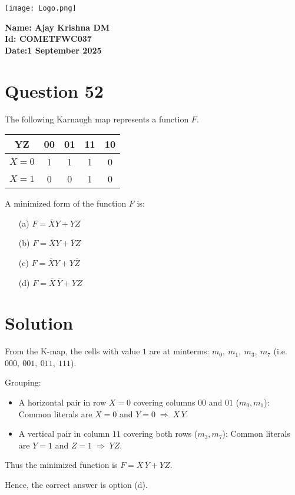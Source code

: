 \documentclass[12pt]{article}
\begin{document}
\begin{minipage}{0.45\textwidth}
  \texttt{[image: Logo.png]}
\end{minipage}
\hfill
\begin{minipage}{0.45\textwidth}
  \raggedleft
  \textbf{Name: Ajay Krishna DM}\\
  \textbf{Id: COMETFWC037}\\
  \textbf{Date:1 September 2025}\\
\end{minipage}

\vspace{1cm}

\section*{Question 52}

The following Karnaugh map represents a function $F$.

\begin{center}
\begin{tabular}{c|c c c c}
   YZ & 00 & 01 & 11 & 10 \\ \hline
   $X=0$ & 1 & 1 & 1 & 0 \\
   $X=1$ & 0 & 0 & 1 & 0 \\
\end{tabular}
\end{center}

\noindent
A minimized form of the function $F$ is:
\begin{enumerate}
  \item[(a)] $F = \overline{X}Y + YZ$
  \item[(b)] $F = \overline{X}Y + \overline{Y}Z$
  \item[(c)] $F = \overline{X}Y + Y\overline{Z}$
  \item[(d)] $F = \overline{X}\,\overline{Y} + YZ$
\end{enumerate}

\section*{Solution}

From the K-map, the cells with value $1$ are at minterms:  
$m_0, \ m_1, \ m_3, \ m_7$ (i.e. $000, \ 001, \ 011, \ 111$).

\noindent
Grouping:
\begin{itemize}
  \item A horizontal pair in row $X=0$ covering columns $00$ and $01$ ($m_0, m_1$):  
  Common literals are $X=0$ and $Y=0 \;\Rightarrow\; \overline{X}\,\overline{Y}$.
  
  \item A vertical pair in column $11$ covering both rows ($m_3, m_7$):  
  Common literals are $Y=1$ and $Z=1 \;\Rightarrow\; YZ$.
\end{itemize}

\noindent
Thus the minimized function is  
$F = \overline{X}\,\overline{Y} + YZ.$

\noindent
Hence, the correct answer is option (d).
\end{document}

